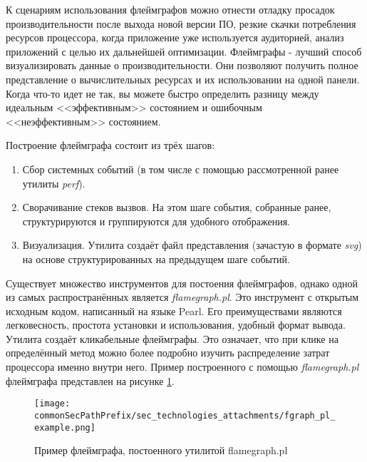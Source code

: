 К сценариям использования флеймграфов можно отнести отладку просадок производительности после выхода новой версии ПО,
резкие скачки потребления ресурсов процессора, когда приложение уже используется аудиторией, анализ приложений с целью
их дальнейшей оптимизации.
Флеймграфы - лучший способ визуализировать данные о производительности.
Они позволяют получить полное представление о вычислительных ресурсах и их использовании на одной панели. 
Когда что-то идет не так, вы можете быстро определить разницу между идеальным <<эффективным>> состоянием и ошибочным <<неэффективным>> состоянием.

Построение флеймграфа состоит из трёх шагов:
\begin{enumerate}
    \item Сбор системных событий (в том числе с помощью рассмотренной ранее утилиты \textit{perf}).
    \item Сворачивание стеков вызвов. На этом шаге события, собранные ранее, структурируются и группируются для удобного отображения.
    \item Визуализация. Утилита создаёт файл представления (зачастую в формате \textit{svg}) на основе структурированных на предыдущем шаге событий.
\end{enumerate}

Существует множество инструментов для постоения флеймграфов, однако одной из самых распространённых является \textit{flamegraph.pl}.
Это инструмент с открытым исходным кодом, написанный на языке Pearl. Его преимуществами являются легковесность, простота установки и использования,
удобный формат вывода. Утилита создаёт кликабельные флеймграфы. Это означает, что при клике на определённый метод можно более подробно изучить распределение
затрат процессора именно внутри него. Пример построенного с помощью \textit{flamegraph.pl} флеймграфа представлен на рисунке \ref{sec_tech:fig:flamegraph_pl_example}.

\begin{figure}[H]
    \centering
    \texttt{[image: \\commonSecPathPrefix/sec\_technologies\_attachments/fgraph\_pl\_example.png]}
    \caption{Пример флеймграфа, постоенного утилитой flamegraph.pl}
    \label{sec_tech:fig:flamegraph_pl_example}
\end{figure}
